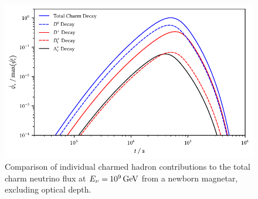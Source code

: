 \begin{figure}[H]
	\centering
	\includegraphics{../plots/build/magnetar_charm_decay_comparison_without.pdf}
	\caption[Magnetar $\nu \kern+0.5pt$ flux from $c$ decay excluding optical depth.]
			{Comparison of individual charmed hadron contributions to the total charm neutrino flux at
			 $E_\nu = \kern-0.5pt \qty{e9}{\giga\electronvolt}$ from a newborn magnetar, excluding optical depth.}
	\label{fig:magnetar-charm-comparison-without}
\end{figure}
